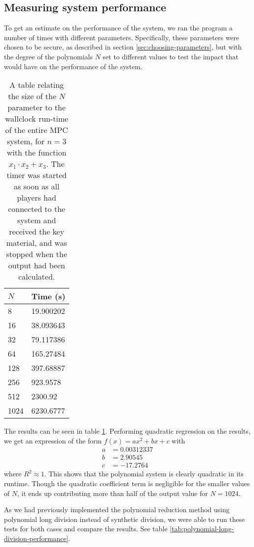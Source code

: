 \documentclass[../main.tex]{subfiles}
\begin{document}
\subsection{Measuring system performance}
To get an estimate on the performance of the system, we ran the program a number of times with different parameters. Specifically, these parameters were chosen to be secure, as described in section \ref{sec:choosing-parameters}, but with the degree of the polynomials $N$ set to different values to test the impact that would have on the performance of the system.

\begin{table}
    \centering
    \begin{tabular}{l|l}
        $N$  & Time (s)   \\ 
        \hline
        8    & 19.900202  \\
        16   & 38.093643  \\
        32   & 79.117386  \\
        64   & 165.27484  \\
        128  & 397.68887  \\
        256  & 923.9578   \\
        512  & 2300.92    \\
        1024 & 6230.6777 
    \end{tabular}
    \caption{A table relating the size of the $N$ parameter to the wallclock run-time of the entire MPC system, for $n = 3$ with the function $x_1 \cdot x_2 + x_3$. The timer was started as soon as all players had connected to the system and received the key material, and was stopped when the output had been calculated.}
    \label{tab:synthetic-division-performance}
\end{table}

The results can be seen in table \ref{tab:synthetic-division-performance}. Performing quadratic regression on the results, we get an expression of the form $f(x) = a x^2 + b x + c$ with
\begin{align*}
    a &= 0.00312337 \\
    b &= 2.90545 \\
    c &= -17.2764
\end{align*}
where $R^2 \approx 1$. This shows that the polynomial system is clearly quadratic in its runtime. Though the quadratic coefficient term is negligible for the smaller values of $N$, it ends up contributing more than half of the output value for $N = 1024$.

As we had previously implemented the polynomial reduction method using polynomial long division instead of synthetic division, we were able to run these tests for both cases and compare the results. See table \ref{tab:polynomial-long-division-performance}.
\end{document}
